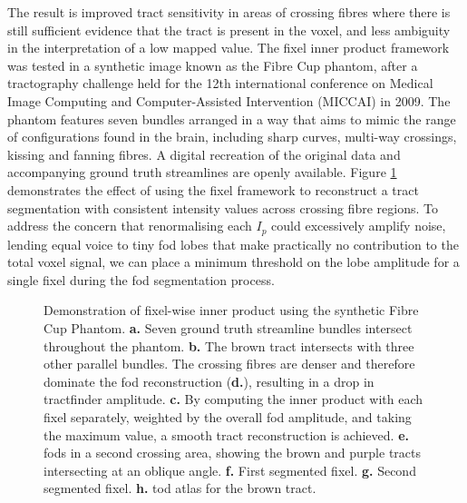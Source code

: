 The result is improved tract sensitivity in areas of crossing fibres where there is still sufficient evidence that the tract is present in the voxel, and less ambiguity in the interpretation of a low mapped value.
The fixel inner product framework was tested in a synthetic image known as the Fibre Cup phantom, after a tractography challenge held for the 12th international conference on Medical Image Computing and Computer-Assisted Intervention (MICCAI) in 2009\autocite{Fillard2011}.
The phantom features seven bundles arranged in a way that aims to mimic the range of configurations found in the brain, including sharp curves, multi-way crossings, kissing and fanning fibres.
A digital recreation of the original data and accompanying ground truth streamlines are openly available\autocite{NITRC}.
Figure \ref{fig:fixip} demonstrates the effect of using the fixel framework to reconstruct a tract segmentation with consistent intensity values across crossing fibre regions.
To address the concern that renormalising each $I_p$ could excessively amplify noise, lending equal voice to tiny \gls{fod} lobes that make practically no contribution to the total voxel signal, we can place a minimum threshold on the lobe amplitude for a single fixel during the \gls{fod} segmentation process.

\begin{figure}[tbh!]
  \centering
  
  \caption{Demonstration of fixel-wise inner product using the synthetic Fibre Cup Phantom.
  \textbf{\sffamily a.} Seven ground truth streamline bundles intersect throughout the phantom.
  \textbf{\sffamily b.} The brown tract intersects with three other parallel bundles. The crossing fibres are denser and therefore dominate the \gls{fod} reconstruction (\textbf{\sffamily d.}), resulting in a drop in tractfinder amplitude.
  \textbf{\sffamily c.} By computing the inner product with each fixel separately, weighted by the overall \gls{fod} amplitude, and taking the maximum value, a smooth tract reconstruction is achieved.
  \textbf{\sffamily e.} \glspl{fod} in a second crossing area, showing the brown and purple tracts intersecting at an oblique angle.
  \textbf{\sffamily f.} First segmented fixel.
  \textbf{\sffamily g.} Second segmented fixel. \textbf{h.} \Gls{tod} atlas for the brown tract.}\label{fig:fixip}
\end{figure}
